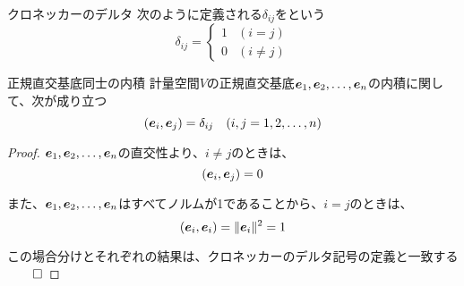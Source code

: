 \documentclass[../../../topic_linear-algebra]{subfiles}
\begin{document}
\begin{definition}{クロネッカーのデルタ}
  次のように定義される$\delta_{ij}$をという
  \begin{equation*}
    \delta_{ij} =
    \begin{cases}
      1 & (i=j)      \\
      0 & (i \neq j)
    \end{cases}
  \end{equation*}
\end{definition}

\begin{theorem}{正規直交基底同士の内積}
  計量空間$V$の正規直交基底$\vb*{e}_1, \vb*{e}_2, \ldots, \vb*{e}_n$の内積に関して、次が成り立つ
  \begin{equation*}
    (\vb*{e}_i, \vb*{e}_j) = \delta_{ij} \quad (i,j=1,2,\ldots,n)
  \end{equation*}
\end{theorem}

\begin{proof}
  $\vb*{e}_1, \vb*{e}_2, \ldots, \vb*{e}_n$の直交性より、$i \neq j$のときは、
  \begin{equation*}
    (\vb*{e}_i, \vb*{e}_j) = 0
  \end{equation*}

  また、$\vb*{e}_1, \vb*{e}_2, \ldots, \vb*{e}_n$はすべてノルムが1であることから、$i=j$のときは、
  \begin{equation*}
    (\vb*{e}_i, \vb*{e}_i) = \|\vb*{e}_i\|^2 = 1
  \end{equation*}

  この場合分けとそれぞれの結果は、クロネッカーのデルタ記号の定義と一致する $\qed$
\end{proof}
\end{document}
